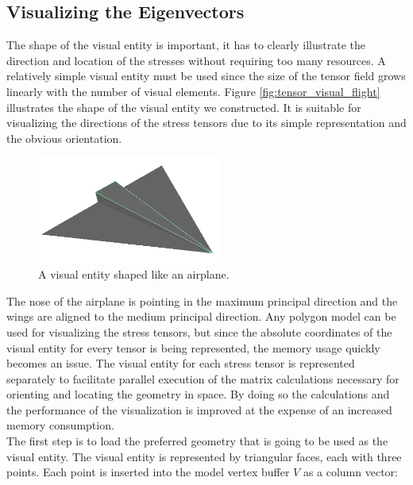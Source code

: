 \subsection{Visualizing the Eigenvectors}
The shape of the visual entity is important, it has to clearly illustrate the
direction and location of the stresses without requiring too many
resources. A relatively simple visual entity must be used since the size of
the tensor field grows linearly with the number of visual
elements. Figure \vref{fig:tensor_visual_flight} illustrates the shape
of the visual entity we constructed.
%
It is suitable
for visualizing the directions of the stress tensors due to its simple
representation and the obvious orientation. 

\begin{figure}
  \centering
  \includegraphics[width=6cm]{./images/helper_tools_tensor_flight.png}
\caption{A visual entity shaped like an airplane.}
\label{fig:tensor_visual_flight}
\end{figure}

The nose of the airplane is pointing in the maximum
principal direction and the wings are aligned to the medium principal
direction.
%
Any polygon model can be used for visualizing the stress tensors, but
since the absolute coordinates of the visual entity for every tensor
is being represented, the memory usage quickly becomes an issue. The visual
entity for each stress tensor is represented separately to facilitate parallel
execution of the matrix calculations necessary for orienting and
locating the geometry in space. By doing so the calculations and the
performance of the visualization is improved at the expense of an
increased memory consumption. \\

The first step is to load the preferred geometry that is going to
be used as the visual entity. The visual entity is represented by
triangular faces, each with three points. Each point is inserted into
the model vertex buffer $V$ as a column vector:

